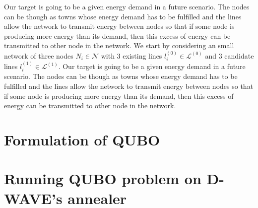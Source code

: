 Our target is going to be a given energy demand in a future scenario. The nodes can be though as towns whose energy demand has to be fulfilled and the lines allow the network to transmit energy between nodes so that if some node is producing more energy than its demand, then this excess of energy can be transmitted to other node in the network.
We start by considering an small network of three nodes $N_{i}\in \mathcal{N}$ with 3 existing lines $l_{i}^{(0)}\in \mathcal{L}^{(0)}$ and 3 candidate lines $l_{i}^{(1)}\in \mathcal{L}^{(1)}$. Our target is going to be a given energy demand in a future scenario. The nodes can be though as towns whose energy demand has to be fulfilled and the lines allow the network to transmit energy between nodes so that if some node is producing more energy than its demand, then this excess of energy can be transmitted to other node in the network.
\section{Formulation of QUBO}
\section{Running QUBO problem on D-WAVE's annealer}

